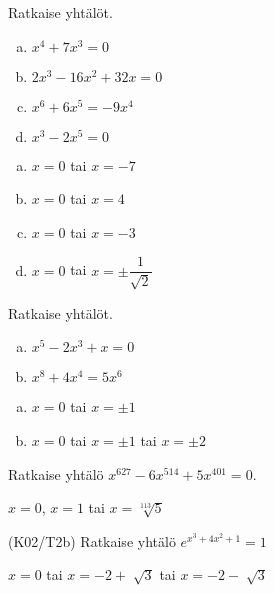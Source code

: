 \begin{tehtava}
    Ratkaise yhtälöt.
    \begin{enumerate}[a)]
        \item $x^4 + 7x^3 = 0$
        \item $2x^3 - 16x^2 + 32x = 0$
        \item $x^6 + 6x^5 = -9x^4$
        \item $x^3 - 2x^5 = 0$      
    \end{enumerate}
    \begin{vastaus}
        \begin{enumerate}[a)]
        	\item $x = 0$ tai $x = -7$
        	\item $x = 0$ tai $x = 4$
        	\item $x = 0$ tai $x = -3$
            \item $x = 0$ tai $x = \pm\dfrac{1}{\sqrt{2}}$
        \end{enumerate}
    \end{vastaus}
\end{tehtava}

\begin{tehtava}
    Ratkaise yhtälöt.
    \begin{enumerate}[a)]
        \item $x^5 - 2x^3 + x = 0$
        \item $x^8 + 4x^4 = 5x^6$       
    \end{enumerate}
    \begin{vastaus}
        \begin{enumerate}[a)]
        	\item $x = 0$ tai $x = \pm1$
        	\item $x = 0$ tai $x = \pm1$ tai $x = \pm2$
        \end{enumerate}
    \end{vastaus}
\end{tehtava}

\begin{tehtava}
	Ratkaise yhtälö $x^{627} - 6x^{514} + 5x^{401} = 0$.
	\begin{vastaus}
		$x = 0$, $x = 1$ tai $x = \sqrt[113]{5}$
	\end{vastaus}
\end{tehtava}

\begin{tehtava}
	(K02/T2b) Ratkaise yhtälö $e^{x^3+4x^2+1}=1$
	\begin{vastaus}
	$x=0$ tai $x=-2 + \sqrt[]{3}$ tai $x=-2 - \sqrt[]{3}$
	\end{vastaus}
\end{tehtava}